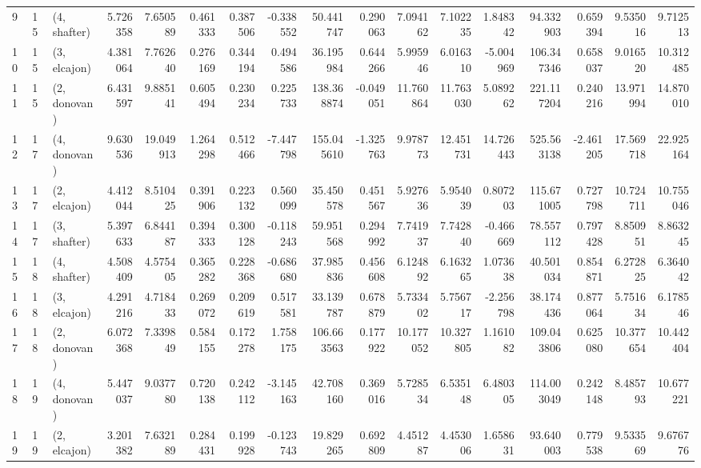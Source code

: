 \begin{tabular}{lllrrrrrrrrrrrrrr}
9  &    15 &  (4, shafter) &   5.726358 &   7.650589 &   0.461333 &  0.387506 &  -0.338552 &   50.441747 &  0.290063 &   7.094162 &   7.102235 &   1.848342 &   94.332903 &  0.659394 &   9.535016 &   9.712513 \\
10 &    15 &  (3, elcajon) &   4.381064 &   7.762640 &   0.276169 &  0.344194 &   0.494586 &   36.195984 &  0.644266 &   5.995946 &   6.016310 &  -5.004969 &  106.347346 &  0.658037 &   9.016520 &  10.312485 \\
11 &    15 &  (2, donovan) &   6.431597 &   9.885141 &   0.605494 &  0.230234 &   0.225733 &  138.368874 & -0.049051 &  11.760864 &  11.763030 &   5.089262 &  221.117204 &  0.240216 &  13.971994 &  14.870010 \\
12 &    17 &  (4, donovan) &   9.630536 &  19.049913 &   1.264298 &  0.512466 &  -7.447798 &  155.045610 & -1.325763 &   9.978773 &  12.451731 &  14.726443 &  525.563138 & -2.461205 &  17.569718 &  22.925164 \\
13 &    17 &  (2, elcajon) &   4.412044 &   8.510425 &   0.391906 &  0.223132 &   0.560099 &   35.450578 &  0.451567 &   5.927636 &   5.954039 &   0.807203 &  115.671005 &  0.727798 &  10.724711 &  10.755046 \\
14 &    17 &  (3, shafter) &   5.397633 &   6.844187 &   0.394333 &  0.300128 &  -0.118243 &   59.951568 &  0.294992 &   7.741937 &   7.742840 &  -0.466669 &   78.557112 &  0.797428 &   8.850951 &   8.863245 \\
15 &    18 &  (4, shafter) &   4.508409 &   4.575405 &   0.365282 &  0.228368 &  -0.686680 &   37.985836 &  0.456608 &   6.124892 &   6.163265 &   1.073638 &   40.501034 &  0.854871 &   6.272825 &   6.364042 \\
16 &    18 &  (3, elcajon) &   4.291216 &   4.718433 &   0.269072 &  0.209619 &   0.517581 &   33.139787 &  0.678879 &   5.733402 &   5.756717 &  -2.256798 &   38.174436 &  0.877064 &   5.751634 &   6.178546 \\
17 &    18 &  (2, donovan) &   6.072368 &   7.339849 &   0.584155 &  0.172278 &   1.758175 &  106.663563 &  0.177922 &  10.177052 &  10.327805 &   1.161082 &  109.043806 &  0.625080 &  10.377654 &  10.442404 \\
18 &    19 &  (4, donovan) &   5.447037 &   9.037780 &   0.720138 &  0.242112 &  -3.145163 &   42.708160 &  0.369016 &   5.728534 &   6.535148 &   6.480305 &  114.003049 &  0.242148 &   8.485793 &  10.677221 \\
19 &    19 &  (2, elcajon) &   3.201382 &   7.632189 &   0.284431 &  0.199928 &  -0.123743 &   19.829265 &  0.692809 &   4.451287 &   4.453006 &   1.658631 &   93.640003 &  0.779538 &   9.533569 &   9.676776 \\

\end{tabular}
